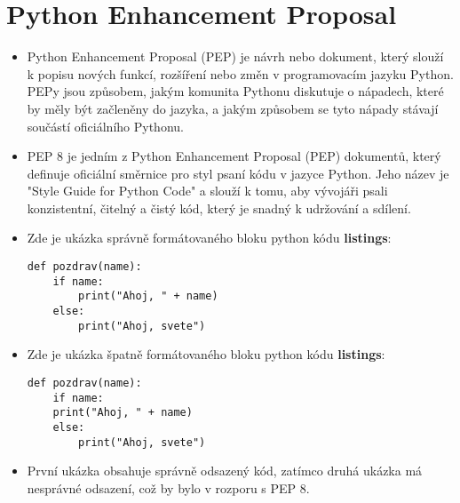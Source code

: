 \documentclass[12pt,a4paper]{article}
\begin{document}
\section{Python Enhancement Proposal}
\begin{itemize}
    \item Python Enhancement Proposal (PEP) je návrh nebo dokument, který slouží k popisu nových funkcí, rozšíření nebo změn v programovacím jazyku Python. PEPy jsou způsobem, jakým komunita Pythonu diskutuje o nápadech, které by měly být začleněny do jazyka, a jakým způsobem se tyto nápady stávají součástí oficiálního Pythonu.

    \item PEP 8 je jedním z Python Enhancement Proposal (PEP) dokumentů, který definuje oficiální směrnice pro styl psaní kódu v jazyce Python. Jeho název je "Style Guide for Python Code" a slouží k tomu, aby vývojáři psali konzistentní, čitelný a čistý kód, který je snadný k udržování a sdílení.

\item Zde je ukázka správně formátovaného bloku python kódu \textbf{listings}:
\begin{center}

\begin{lstlisting}
def pozdrav(name):
    if name:
        print("Ahoj, " + name)
    else:
        print("Ahoj, svete")
\end{lstlisting}
\end{center}
\item Zde je ukázka špatně formátovaného bloku python kódu \textbf{listings}:

\begin{lstlisting}
def pozdrav(name):
    if name:
    print("Ahoj, " + name)
    else:
        print("Ahoj, svete")
\end{lstlisting}
\item První ukázka obsahuje správně odsazený kód, zatímco druhá ukázka má nesprávné odsazení, což by bylo v rozporu s PEP 8.
\end{itemize}
\end{document}

